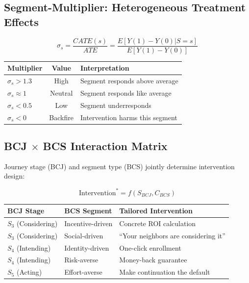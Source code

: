 \subsection{Segment-Multiplier: Heterogeneous Treatment Effects}

\begin{equation}
\boxed{
\sigma_s = \frac{CATE(s)}{ATE} = \frac{E[Y(1) - Y(0) | S = s]}{E[Y(1) - Y(0)]}
}
\label{eq:mp-segment-multiplier}
\end{equation}

\begin{center}
\renewcommand{\arraystretch}{1.2}
\begin{tabular}{@{}lcp{6cm}@{}}
\toprule
\textbf{Multiplier} & \textbf{Value} & \textbf{Interpretation} \\
\midrule
$\sigma_s > 1.3$ & High & Segment responds above average \\
$\sigma_s \approx 1$ & Neutral & Segment responds like average \\
$\sigma_s < 0.5$ & Low & Segment underresponds \\
$\sigma_s < 0$ & Backfire & Intervention harms this segment \\
\bottomrule
\end{tabular}
\end{center}

\subsection{BCJ $\times$ BCS Interaction Matrix}

Journey stage (BCJ) and segment type (BCS) jointly determine intervention design:

\begin{equation}
\boxed{
\text{Intervention}^* = f(S_{BCJ}, C_{BCS})
}
\label{eq:mp-bcj-bcs}
\end{equation}

\begin{center}
\small
\renewcommand{\arraystretch}{1.2}
\begin{tabular}{@{}llp{5cm}@{}}
\toprule
\textbf{BCJ Stage} & \textbf{BCS Segment} & \textbf{Tailored Intervention} \\
\midrule
$S_3$ (Considering) & Incentive-driven & Concrete ROI calculation \\
$S_3$ (Considering) & Social-driven & ``Your neighbors are considering it'' \\
$S_4$ (Intending) & Identity-driven & One-click enrollment \\
$S_4$ (Intending) & Risk-averse & Money-back guarantee \\
$S_5$ (Acting) & Effort-averse & Make continuation the default \\
\bottomrule
\end{tabular}
\end{center}

